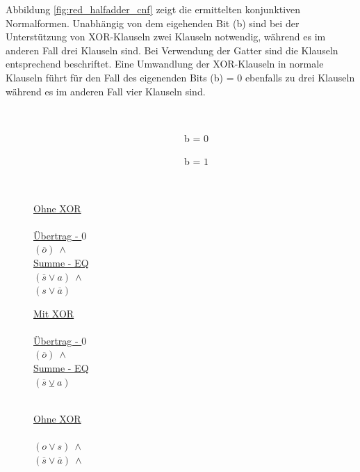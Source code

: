 Abbildung \ref{fig:red_halfadder_cnf} zeigt die ermittelten konjunktiven Normalformen. Unabhängig von dem eigehenden Bit (b) sind bei der Unterstützung
von XOR-Klauseln zwei Klauseln notwendig, während es im anderen Fall drei Klauseln sind. Bei Verwendung der Gatter sind die Klauseln entsprechend beschriftet.
Eine Umwandlung der XOR-Klauseln in normale Klauseln führt für den Fall des eigenenden Bits (b) = 0 ebenfalls zu drei Klauseln während es im anderen Fall vier
Klauseln sind.
\begin{figure}[!h]
  \centering
  \begin{minipage}[c]{0.3cm}
    ~
  \end{minipage}
  \begin{minipage}[c]{7.1cm}
    ~~~~~~~~~~~~~~~~~~~~~~~~~~~~~~~b = $0$
  \end{minipage}
  \begin{minipage}[c]{7cm}
    ~~~~~~~~~~~~~~~~~~~~~~~~~~~~~~~b = $1$
  \end{minipage}
  \begin{minipage}[l]{0.4cm}
    ~
  \end{minipage}
  \begin{minipage}[l]{3.5cm}
    \underline{Ohne XOR}\\
    ~\\
    \underline{Übertrag - $0$}\\
    $ (\overline{o}) ~ \wedge $\\
    \underline{Summe - EQ}\\
    $ (\overline{s} \vee  a) ~ \wedge $\\
    $ (s \vee \overline{a}) $
  \end{minipage}
  \begin{minipage}[l]{3.5cm}
    \underline{Mit XOR}\\
    ~\\
    \underline{Übertrag - $0$}\\
    $ (\overline{o}) ~ \wedge $\\
    \underline{Summe - EQ}\\
    $ (\overline{s} \veebar a) $\\
    ~
  \end{minipage}
  \begin{minipage}[l]{3.5cm}
    \underline{Ohne XOR}\\
    ~\\
    $ (o \vee  s) ~ \wedge $\\
    $ (\overline{s} \vee  \overline{a}) ~ \wedge $\\

\end{minipage}
\end{figure}
